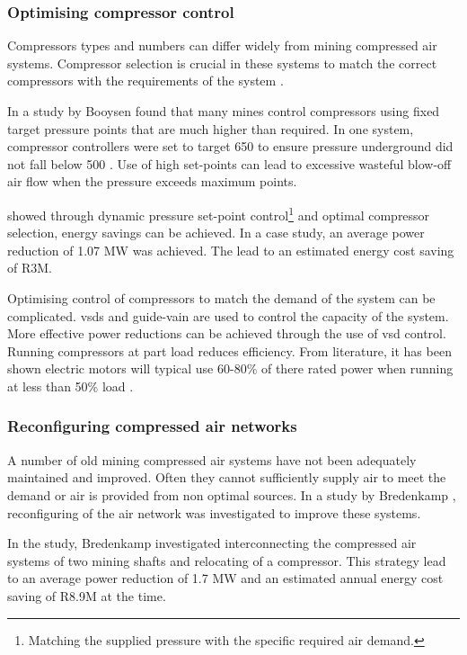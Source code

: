 		\subsubsection{Optimising compressor control}
		Compressors types and numbers can differ widely from mining compressed air systems. Compressor selection is crucial in these systems to match the correct compressors with the requirements of the system \cite{marais2010expert}.
		\par 
		In a study by Booysen \cite{Booysen2012Masters} found that many mines control compressors using fixed target pressure points that are much higher than required. In one system, compressor controllers were set to target 650  to ensure pressure underground did not fall below 500 . Use of high set-points can lead to excessive wasteful blow-off air flow when the pressure exceeds maximum points.
		\par
		 \cite{booysen2009optimising} showed through dynamic pressure set-point control\footnote{Matching the supplied pressure with the specific required air demand.} and optimal compressor selection, energy savings can be achieved. In a case study, an average power reduction of 1.07 MW was achieved. The lead to an estimated energy cost saving of R3M.
		\par 
	 	Optimising control of compressors to match the demand of the system can be complicated. \glspl{vsd} and guide-vain are used to control the capacity of the system. More effective power reductions can be achieved through the use of \gls{vsd} control. Running compressors at part load reduces efficiency. From literature, it has been shown electric motors will typical use 60-80\% of there rated power when running at less than 50\% load \cite{Saidur2010}.
		\subsubsection{Reconfiguring compressed air networks}
			A number of old mining compressed air systems have not been adequately maintained and improved. Often they cannot sufficiently supply air to meet the demand or air is provided from non optimal sources. In a study by Bredenkamp \cite{Bredenkamp2013Masters}, reconfiguring of the air network was investigated to improve these systems.
			\par 
			In the study, Bredenkamp investigated interconnecting the compressed air systems of two mining shafts and relocating of a compressor. This strategy lead to an average power reduction of 1.7 MW and an estimated annual energy cost saving of R8.9M at the time.
			
